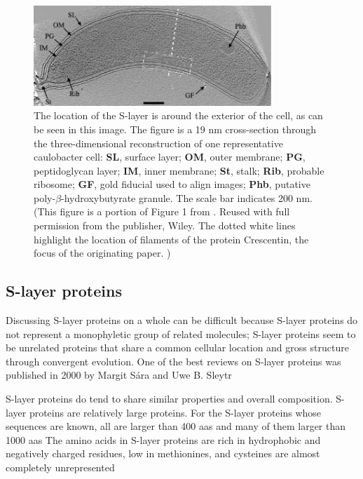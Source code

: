 \begin{figure}[htb]
  \begin{center}
    \includegraphics[width=0.8\textwidth]{intro/img/jensentomograph.jpg}
  \end{center}
  \caption[Electrotomograph of \ac{caulobacter}]{ The location of the \ac{S-layer} is around the
    exterior of the cell, as can be seen in this image. The figure is a 19 \si{\nano\meter}
    cross-section through the three-dimensional reconstruction of one representative
    \ac{caulobacter} cell: \textbf{SL}, surface layer;
    \textbf{OM}, outer membrane; \textbf{PG}, peptidoglycan layer; \textbf{IM}, inner membrane;
    \textbf{St}, stalk; \textbf{Rib}, probable ribosome; \textbf{GF}, gold fiducial used to align
    images; \textbf{Phb}, putative poly-$\beta$-hydroxybutyrate granule. The scale bar indicates 200 \si{\nano\meter}.  (This figure is a portion of Figure 1 from . Reused
    with full permission from the publisher, Wiley. The dotted white lines highlight the location of filaments of the protein Crescentin, the focus of the originating paper. )}
  \label{fig:intro-tomo}
\end{figure}

\subsection{S-layer proteins} \label{sub:intro-slayerproteins} %

Discussing \ac{S-layer} proteins on a whole can be difficult because \ac{S-layer} proteins do not represent a monophyletic group of related molecules; \ac{S-layer} proteins seem to be  unrelated proteins that share a common cellular location and gross structure through convergent evolution. One of the best reviews on \ac{S-layer} proteins was published in 2000 by Margit S\'{a}ra and Uwe B. Sleytr 

\ac{S-layer} proteins do tend to share similar properties and overall composition. \ac{S-layer} proteins are relatively large proteins. For the \ac{S-layer} proteins whose sequences are known, all are larger than 400 \acp{aa} and many of them larger than 1000 \acp{aa} The amino acids in \ac{S-layer} proteins are rich in hydrophobic and negatively charged residues, low in methionines, and  cysteines are almost completely unrepresented  

